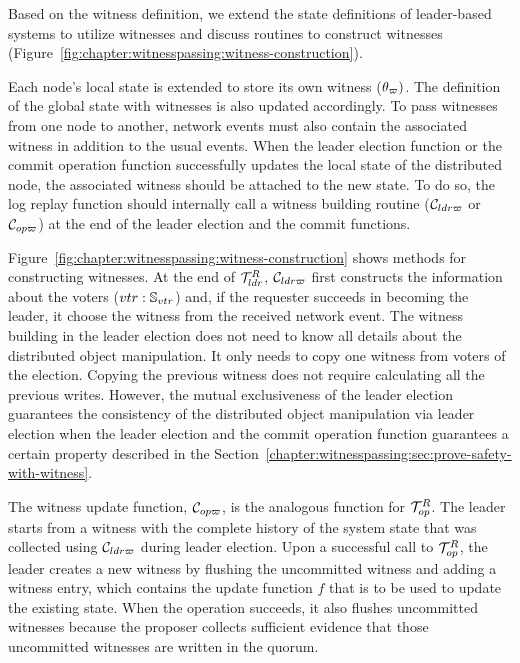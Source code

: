 Based on the witness definition, we extend the state definitions of
leader-based systems to utilize witnesses and discuss routines to construct
witnesses (Figure~\ref{fig:chapter:witnesspassing:witness-construction}).

Each node's local state is extended to store its own witness ($\theta_\varpi)$.
The definition of the global state with witnesses is also updated accordingly.
To pass witnesses from one node to another,
network events must also contain the associated witness in addition to the usual events.
When the leader election function or the commit operation function successfully updates the local state of the distributed node, the associated witness should be
attached to the new state. To do so, the log replay function should internally call a witness building routine ($\mathcal{C}_{ldr\varpi}$ or $\mathcal{C}_{op\varpi}$) at the end of the
leader election and the commit functions.

Figure~\ref{fig:chapter:witnesspassing:witness-construction} shows methods for constructing witnesses.
At the end of $\mathcal{T}^{R}_{ldr}$, $\mathcal{C}_{ldr\varpi}$ first constructs the information about the
voters ($vtr:\mathbb{S}_{vtr}$) and, if the requester succeeds in becoming the leader,
it choose the witness from the received network event. 
The witness building in the leader election does not need to know 
all details about the distributed object manipulation.
It only needs to copy one witness from voters of the election.
Copying the previous witness does not require calculating all the previous writes. 
However, the mutual exclusiveness of the leader election guarantees the consistency of the distributed object manipulation via leader election when the leader election and the commit operation function guarantees a 
 certain property described in the Section~\ref{chapter:witnesspassing:sec:prove-safety-with-witness}. 
 
The witness update function, $\mathcal{C}_{op\varpi}$, is the analogous function for $\mathcal{T}^{R}_{op}$.
The leader starts from a witness with the complete history of the system state
that was collected using $\mathcal{C}_{ldr\varpi}$ during leader election.
Upon a successful call to $\mathcal{T}^{R}_{op}$, the leader creates a new witness by flushing the uncommitted witness and 
adding a witness entry, which contains the update function $f$ that is to be used
to update the existing state.
When the operation succeeds, it also flushes uncommitted witnesses because the proposer collects  sufficient evidence that those uncommitted witnesses are written in the quorum.  

